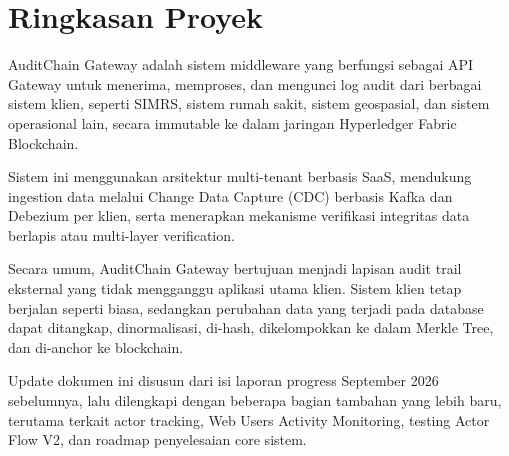\chapter{Ringkasan Proyek}

AuditChain Gateway adalah sistem middleware yang berfungsi sebagai API Gateway untuk menerima, memproses, dan mengunci log audit dari berbagai sistem klien, seperti SIMRS, sistem rumah sakit, sistem geospasial, dan sistem operasional lain, secara immutable ke dalam jaringan Hyperledger Fabric Blockchain.

Sistem ini menggunakan arsitektur multi-tenant berbasis SaaS, mendukung ingestion data melalui Change Data Capture (CDC) berbasis Kafka dan Debezium per klien, serta menerapkan mekanisme verifikasi integritas data berlapis atau multi-layer verification.

\architecturediagram

Secara umum, AuditChain Gateway bertujuan menjadi lapisan audit trail eksternal yang tidak mengganggu aplikasi utama klien. Sistem klien tetap berjalan seperti biasa, sedangkan perubahan data yang terjadi pada database dapat ditangkap, dinormalisasi, di-hash, dikelompokkan ke dalam Merkle Tree, dan di-anchor ke blockchain.

Update dokumen ini disusun dari isi laporan progress September 2026 sebelumnya, lalu dilengkapi dengan beberapa bagian tambahan yang lebih baru, terutama terkait actor tracking, Web Users Activity Monitoring, testing Actor Flow V2, dan roadmap penyelesaian core sistem.
